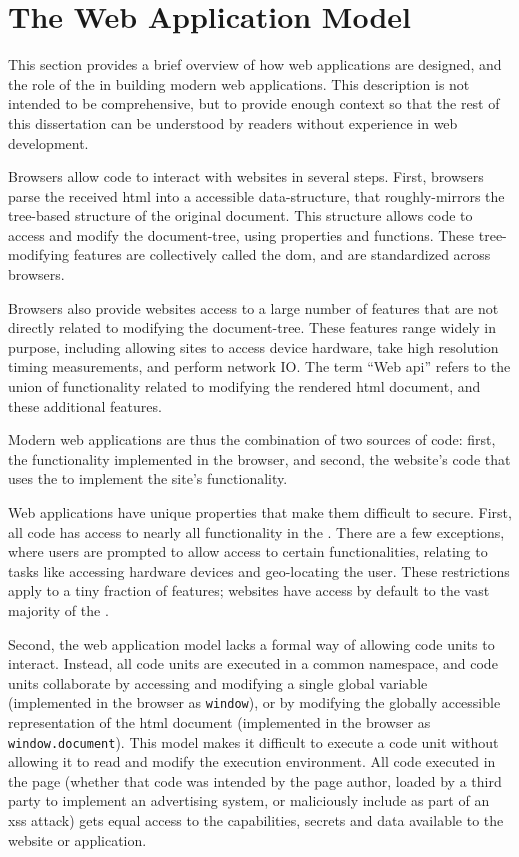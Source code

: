 \section{The Web Application Model}
\label{background:web-application-model}

This section provides a brief overview of how web applications are designed,
and the role of the \WAPI in building modern web applications.
This description is not intended to be comprehensive, but to provide enough
context so that the rest of this dissertation can be understood
by readers without experience in web development.

Browsers allow \JS code to interact with websites in several steps. First,
browsers parse the received \gls{html} into a \JS accessible data-structure,
that roughly-mirrors the tree-based structure of the original document.
This structure allows \JS code to access and modify the document-tree,
using \JS properties and functions.  These tree-modifying \JS features are
collectively called the \gls{dom}, and are standardized across browsers.

Browsers also provide websites access to a large number of \JS features
that are not directly related to modifying the document-tree.  These
features range widely in purpose, including allowing sites to
access device hardware, take high resolution timing measurements, and
perform network IO.  The term ``Web \gls{api}'' refers to the union of
functionality related to modifying the rendered \gls{html} document, and
these additional \JS features.

Modern web applications are thus the combination of two sources of code:
first, the \WAPI functionality implemented in the browser, and second,
the website's \JS code that uses the \WAPI to implement the site's functionality.

Web applications have unique properties that make them difficult to secure.
First, all \JS code has access to nearly all functionality in the \WAPI.
There are a few exceptions, where users are
prompted to allow access to certain functionalities, relating
to tasks like accessing hardware devices and geo-locating the user.  These
restrictions apply to a tiny fraction of features; websites have
access by default to the vast majority of the \WAPI.

Second, the web application model lacks a formal
way of allowing code units to interact.  Instead, all code units are
executed in a common namespace, and code units collaborate by accessing and
modifying a single global variable (implemented in the browser as
\texttt{window}), or by modifying the globally accessible representation of the
\gls{html} document (implemented in the browser as \texttt{window.document}).
This model makes it difficult to execute a code unit without allowing
it to read and modify the execution environment.  All code executed in the
page (whether that code was intended by the page author, loaded by a third
party to implement an advertising system, or maliciously include as part of
an \gls{xss} attack) gets equal access to the capabilities, secrets and data
available to the website or application.

